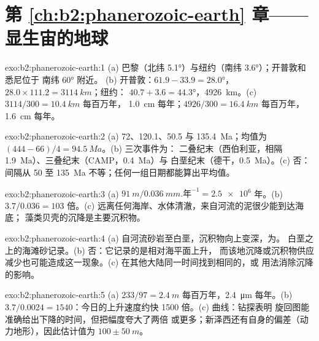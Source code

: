 \section*{第 \ref{ch:b2:phanerozoic-earth} 章——显生宙的地球}

\begin{solution}{exo:b2:phanerozoic-earth:1}
(a) 巴黎（北纬 \ang{5.1}）与纽约（南纬 \ang{3.6}）；开普敦和悉尼位于 南纬 \ang{60} 附近。
(b) 开普敦：$61.9 - 33.9 = \ang{28.0}$，$28.0 \times 111.2 = \qty{3114}{km}$；纽约：
$40.7 + 3.6 = \ang{44.3}$，\qty{4926}{km}。(c) $3114/300 = \qty{10.4}{km}$ 每百万年，
\qty{1.0}{cm} 每年；$4926/300 = \qty{16.4}{km}$ 每百万年，\qty{1.6}{cm} 每年。
\end{solution}

\begin{solution}{exo:b2:phanerozoic-earth:2}
(a) 72、120.1、50.5 与 \qty{135.4}{Ma}；均值为 $(444 - 66)/4 = \qty{94.5}{Ma}$。(b) 三次事件为：
二叠纪末（西伯利亚，相隔 \qty{1.9}{Ma}）、三叠纪末（CAMP，\qty{0.4}{Ma}）与
白垩纪末（德干，\qty{0.5}{Ma}）。(c) 否：间隔从 50 至
\qty{135}{Ma} 不等；任何一组日期都能算出平均值。
\end{solution}

\begin{solution}{exo:b2:phanerozoic-earth:3}
(a) $\qty{91}{m}/\qty{0.036}{mm.\text{年}^{-1}} = \num{2.5e6}$ 年。(b) $3.7/0.036 = 103$ 倍。(c)
远离任何海岸、水体清澈，来自河流的泥很少能到达海底；
藻类贝壳的沉降是主要沉积物。
\end{solution}

\begin{solution}{exo:b2:phanerozoic-earth:4}
(a) 自河流砂岩至白垩，沉积物向上变深，为。
白垩之上的海滩砂记录。(b) 否：它记录的是相对海平面上升，
而该地沉降或沉积物供应减少也可能造成这一现象。(c)
在其他大陆同一时间找到相同的，或
用法消除沉降的影响。
\end{solution}

\begin{solution}{exo:b2:phanerozoic-earth:5}
(a) $233/97 = \qty{2.4}{m}$ 每百万年，\qty{2.4}{\micro m} 每年。(b) $3.7/0.0024 =
1540$：今日的上升速度约快 1500 倍。(c) 曲线：钻探表明
旋回图能准确给出下降的时间，但把幅度夸大了两倍
或更多；新泽西还有自身的偏差（动力地形），因此估计值为 $100 \pm
\qty{50}{m}$。
\end{solution}

